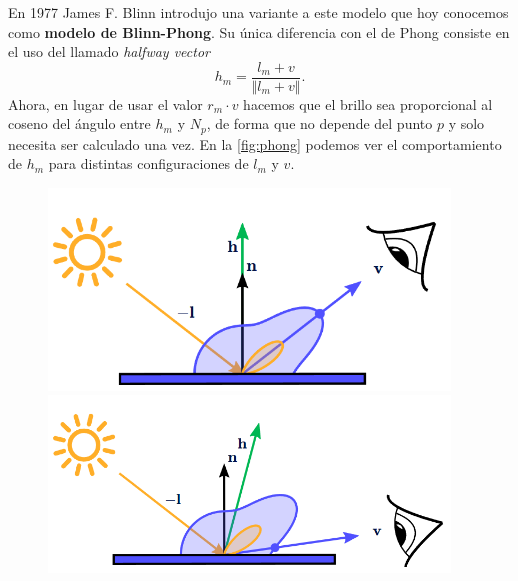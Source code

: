 En 1977 James F. Blinn \cite{blinn1977models} introdujo una variante a este modelo que hoy conocemos como \textbf{modelo de Blinn-Phong}. Su única diferencia con el de Phong consiste en el uso del llamado \textit{halfway vector}
\begin{equation*}
    h_m = \frac{l_m + v}{\Vert l_m + v\Vert}.
\end{equation*}
Ahora, en lugar de usar el valor $r_m\cdot v$ hacemos que el brillo sea proporcional al coseno del ángulo entre $h_m$ y $N_p$, de forma que no depende del punto $p$ y solo necesita ser calculado una vez. En la \autoref{fig:phong} podemos ver el comportamiento de $h_m$ para distintas configuraciones de $l_m$ y $v$.\newline
\begin{figure}[!h]
     \begin{minipage}[c]{0.32\linewidth}
        \centering
        \includegraphics[width=0.95\textwidth, align=b]{Plantilla-TFG-master/img/phong1.png}
     \end{minipage}
     \begin{minipage}[c]{0.32\linewidth}
        \centering
        \includegraphics[width=0.95\textwidth, align=b]{Plantilla-TFG-master/img/phong2.png}
     \end{minipage}
     \begin{minipage}[c]{0.32\linewidth}
        \centering

\end{minipage}
\end{figure}
